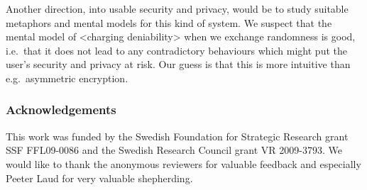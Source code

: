 Another direction, into usable security and privacy, would be to study suitable 
metaphors and mental models for this kind of system.
We suspect that the mental model of <charging deniability> when we exchange 
randomness is good, i.e.~that it does not lead to any contradictory behaviours 
which might put the user's security and privacy at risk.
Our guess is that this is more intuitive than e.g.~asymmetric encryption.


\subsubsection*{Acknowledgements}

This work was funded by the Swedish Foundation for Strategic Research grant SSF 
FFL09-0086 and the Swedish Research Council grant VR 2009-3793.
We would like to thank the anonymous reviewers for valuable feedback and 
especially Peeter Laud for very valuable shepherding.


\printbibliography{}

